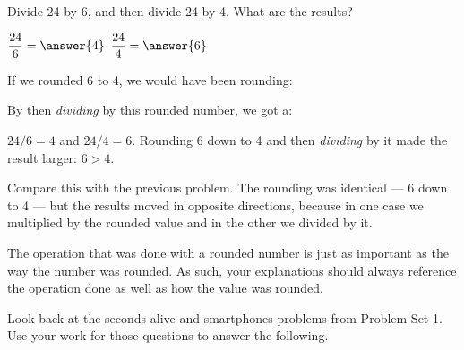 \documentclass[12pt]{ximera}
\begin{document}
\begin{problem}
Divide 24 by 6, and then divide 24 by 4. What are the results?

$\dfrac{24}{6} = \answer{4}$ \qquad $\dfrac{24}{4} = \answer{6}$

If we rounded 6 to 4, we would have been rounding:
\begin{multipleChoice}
\end{multipleChoice}

By then \emph{dividing} by this rounded number, we got a:
\begin{multipleChoice}
\end{multipleChoice}

\begin{solution}
$24/6 = 4$ and $24/4 = 6$. Rounding 6 down to 4 and then \emph{dividing} by it made the
result larger: $6 > 4$.

Compare this with the previous problem. The rounding was identical --- 6 down to 4 ---
but the results moved in opposite directions, because in one case we multiplied by the
rounded value and in the other we divided by it.
\end{solution}
\end{problem}

The operation that was done with a rounded number is just as important as the way the
number was rounded. As such, your explanations should always reference the operation
done as well as how the value was rounded.

Look back at the seconds-alive and smartphones problems from Problem Set 1. Use your
work for those questions to answer the following.
\end{document}
